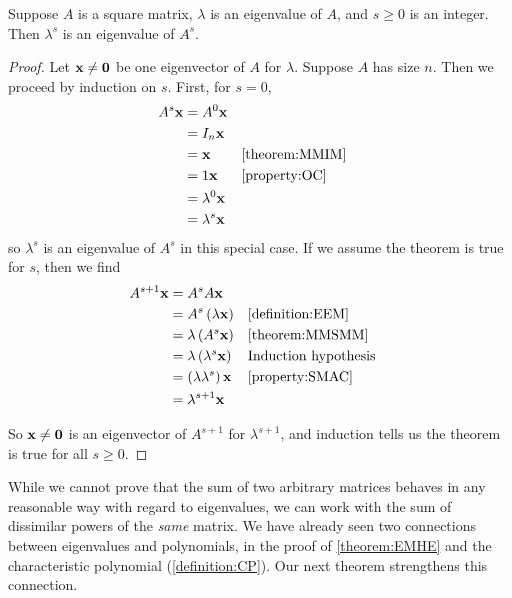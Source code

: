 \documentclass{ximera}
\begin{document}
\begin{theorem}
\label{theorem:EOMP}

Suppose $A$ is a square matrix, $\lambda$ is an eigenvalue of $A$, and $s\geq 0$ is an integer.  Then $\lambda^s$ is an eigenvalue of $A^s$.

\begin{proof}
Let $\mathbf{x}\neq\mathbf{0}$ be one eigenvector of $A$ for $\lambda$.  Suppose $A$ has size $n$.  Then we proceed by induction on $s$.  First, for $s=0$,
\begin{align*}
A^s\mathbf{x}&=A^0\mathbf{x}\\
&=I_n\mathbf{x}\\
&=\mathbf{x}&&\ref{theorem:MMIM}\\
&=1\mathbf{x}&&\ref{property:OC}\\
&=\lambda^0\mathbf{x}\\
&=\lambda^s\mathbf{x}\\
\end{align*}
so $\lambda^s$ is an eigenvalue of $A^s$ in this special case.  If we assume the theorem is true for $s$, then we find
\begin{align*}
A^{s+1}\mathbf{x}&=A^sA\mathbf{x}\\
&=A^s\left(\lambda\mathbf{x}\right)&&\ref{definition:EEM}\\
&=\lambda\left(A^s\mathbf{x}\right)&&\ref{theorem:MMSMM}\\
&=\lambda\left(\lambda^s\mathbf{x}\right)&&\text{Induction hypothesis}\\
&=\left(\lambda\lambda^s\right)\mathbf{x}&&\ref{property:SMAC}\\
&=\lambda^{s+1}\mathbf{x}
\end{align*}

So $\mathbf{x}\neq\mathbf{0}$ is an eigenvector of $A^{s+1}$ for $\lambda^{s+1}$, and induction tells us the theorem is true for all $s\geq 0$.

\end{proof}
\end{theorem}

While we cannot prove that the sum of two arbitrary matrices behaves
in any reasonable way with regard to eigenvalues, we can work with the
sum of dissimilar powers of the \textit{same} matrix.  We have already
seen two connections between eigenvalues and polynomials, in the proof
of \ref{theorem:EMHE} and the characteristic polynomial
(\ref{definition:CP}).  Our next theorem strengthens this connection.
\end{document}
